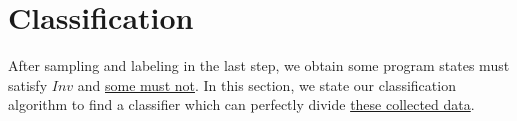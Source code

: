 
\section{Classification} %
\label{sec:classification}

After sampling and labeling in the last step, 
we obtain some program states must satisfy $Inv$ and \underline{some must not}. 
In this section, we state our classification algorithm to find a classifier 
which can perfectly divide \underline{these collected data}.


